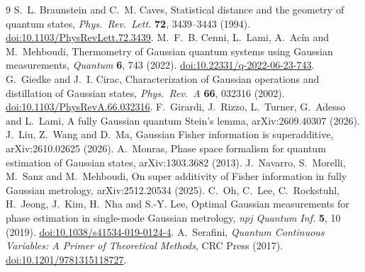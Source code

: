 \documentclass[11pt,a4paper]{article}
\theoremstyle{definition}\newtheorem{definition}{Definition}
\theoremstyle{remark}\newtheorem{remark}{Remark}
\begin{document}
\begin{thebibliography}{9}\small
{} S.~L. Braunstein and C.~M. Caves, Statistical distance and the geometry of quantum states, \emph{Phys.\ Rev.\ Lett.} \textbf{72}, 3439--3443 (1994). \href{https://doi.org/10.1103/PhysRevLett.72.3439}{doi:10.1103/PhysRevLett.72.3439}.
 M.~F.~B. Cenni, L.~Lami, A.~Ac\'in and M.~Mehboudi, Thermometry of Gaussian quantum systems using Gaussian measurements, \emph{Quantum} \textbf{6}, 743 (2022). \href{https://doi.org/10.22331/q-2022-06-23-743}{doi:10.22331/q-2022-06-23-743}.
 G.~Giedke and J.~I. Cirac, Characterization of Gaussian operations and distillation of Gaussian states, \emph{Phys.\ Rev.\ A} \textbf{66}, 032316 (2002). \href{https://doi.org/10.1103/PhysRevA.66.032316}{doi:10.1103/PhysRevA.66.032316}.
 F.~Girardi, J.~Rizzo, L.~Turner, G.~Adesso and L.~Lami, A fully Gaussian quantum Stein's lemma, arXiv:2609.40307 (2026).
 J.~Liu, Z.~Wang and D.~Ma, Gaussian Fisher information is superadditive, arXiv:2610.02625 (2026).
 A.~Monras, Phase space formalism for quantum estimation of Gaussian states, arXiv:1303.3682 (2013).
 J.~Navarro, S.~Morelli, M.~Sanz and M.~Mehboudi, On super additivity of Fisher information in fully Gaussian metrology, arXiv:2512.20534 (2025).
 C.~Oh, C.~Lee, C.~Rockstuhl, H.~Jeong, J.~Kim, H.~Nha and S.-Y. Lee, Optimal Gaussian measurements for phase estimation in single-mode Gaussian metrology, \emph{npj Quantum Inf.} \textbf{5}, 10 (2019). \href{https://doi.org/10.1038/s41534-019-0124-4}{doi:10.1038/s41534-019-0124-4}.
 A.~Serafini, \emph{Quantum Continuous Variables: A Primer of Theoretical Methods}, CRC Press (2017). \href{https://doi.org/10.1201/9781315118727}{doi:10.1201/9781315118727}.
\end{thebibliography}
\end{document}
